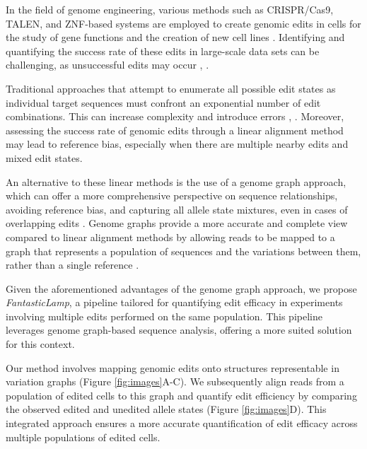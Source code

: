 \documentclass{bioinfo}
\theoremstyle{definition}
\begin{document}
In the field of genome engineering, various methods such as CRISPR/Cas9, TALEN, and ZNF-based systems are employed to create genomic edits in cells for the study of gene functions and the creation of new cell lines \citep{gaj2013zfn}.
Identifying and quantifying the success rate of these edits in large-scale data sets can be challenging, as unsuccessful edits may occur \citep{guell2014genome}, \citep{van2020delivery}.

Traditional approaches that attempt to enumerate all possible edit states as individual target sequences must confront an exponential number of edit combinations.
This can increase complexity and introduce errors \citep{huang2013short}, \citep{mun2021leviosam}.
Moreover, assessing the success rate of genomic edits through a linear alignment method may lead to reference bias, especially when there are multiple nearby edits and mixed edit states.

An alternative to these linear methods is the use of a genome graph approach, which can offer a more comprehensive perspective on sequence relationships, avoiding reference bias, and capturing all allele state mixtures, even in cases of overlapping edits \citep{eggertsson2017graphtyper,Martiniano_2020}.
Genome graphs provide a more accurate and complete view compared to linear alignment methods by allowing reads to be mapped to a graph that represents a population of sequences and the variations between them, rather than a single reference \citep{garrison2018variation,paten2017genome}.

Given the aforementioned advantages of the genome graph approach, we propose \textit{FantasticLamp}, a pipeline tailored for quantifying edit efficacy in experiments involving multiple edits performed on the same population.
This pipeline leverages genome graph-based sequence analysis, offering a more suited solution for this context.

Our method involves mapping genomic edits onto structures representable in variation graphs (Figure \ref{fig:images}A-C).
We subsequently align reads from a population of edited cells to this graph and quantify edit efficiency by comparing the observed edited and unedited allele states (Figure \ref{fig:images}D).
This integrated approach ensures a more accurate quantification of edit efficacy across multiple populations of edited cells.
\end{document}
